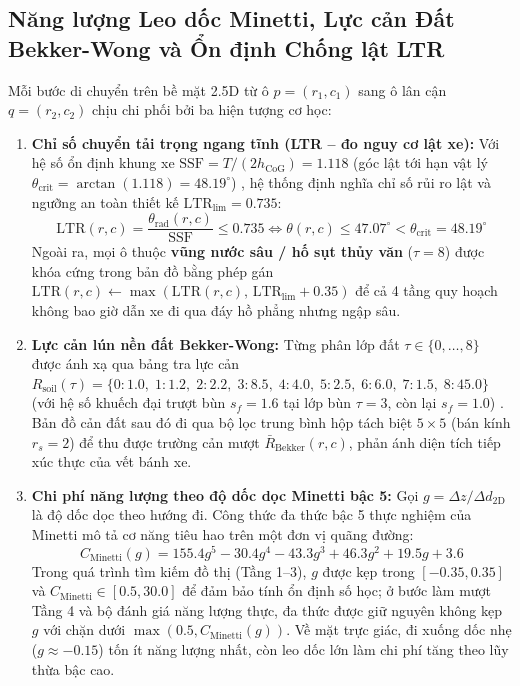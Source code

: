 \documentclass[12pt, a4paper]{article}
\begin{document}
\subsection{Năng lượng Leo dốc Minetti, Lực cản Đất Bekker-Wong và Ổn định Chống lật LTR}
Mỗi bước di chuyển trên bề mặt 2.5D từ ô $p=(r_1,c_1)$ sang ô lân cận $q=(r_2,c_2)$ chịu chi phối bởi ba hiện tượng cơ học:
\begin{enumerate}
    \item \textbf{Chỉ số chuyển tải trọng ngang tĩnh (LTR -- đo nguy cơ lật xe):} Với hệ số ổn định khung xe $\text{SSF} = T/(2h_{\text{CoG}}) = 1.118$ (góc lật tới hạn vật lý $\theta_{\text{crit}} = \arctan(1.118) = 48.19^\circ$) \cite{chen2012ltr, larish2013ltr}, hệ thống định nghĩa chỉ số rủi ro lật và ngưỡng an toàn thiết kế $\text{LTR}_{\text{lim}} = 0.735$:
    \begin{equation}
        \text{LTR}(r,c) = \frac{\theta_{\text{rad}}(r,c)}{\text{SSF}} \le 0.735 \iff \theta(r,c) \le 47.07^\circ < \theta_{\text{crit}} = 48.19^\circ
        \label{eq:ltr_safe}
    \end{equation}
    Ngoài ra, mọi ô thuộc \textbf{vũng nước sâu / hố sụt thủy văn} ($\tau = 8$) được khóa cứng trong bản đồ bằng phép gán $\text{LTR}(r,c) \leftarrow \max(\text{LTR}(r,c),\, \text{LTR}_{\text{lim}} + 0.35)$ để cả 4 tầng quy hoạch không bao giờ dẫn xe đi qua đáy hồ phẳng nhưng ngập sâu.
    \item \textbf{Lực cản lún nền đất Bekker-Wong:} Từng phân lớp đất $\tau \in \{0,\dots,8\}$ được ánh xạ qua bảng tra lực cản $R_{\text{soil}}(\tau) = \{0{:}1.0,\; 1{:}1.2,\; 2{:}2.2,\; 3{:}8.5,\; 4{:}4.0,\; 5{:}2.5,\; 6{:}6.0,\; 7{:}1.5,\; 8{:}45.0\}$ (với hệ số khuếch đại trượt bùn $s_f = 1.6$ tại lớp bùn $\tau=3$, còn lại $s_f = 1.0$) \cite{bekker1956, wong2008, higa2019}. Bản đồ cản đất sau đó đi qua bộ lọc trung bình hộp tách biệt $5\times 5$ (bán kính $r_s = 2$) để thu được trường cản mượt $\bar{R}_{\text{Bekker}}(r,c)$, phản ánh diện tích tiếp xúc thực của vết bánh xe.
    \item \textbf{Chi phí năng lượng theo độ dốc dọc Minetti bậc 5:} Gọi $g = \Delta z / \Delta d_{\text{2D}}$ là độ dốc dọc theo hướng đi. Công thức đa thức bậc 5 thực nghiệm của Minetti \cite{minetti1993, minetti2002} mô tả cơ năng tiêu hao trên một đơn vị quãng đường:
    \begin{equation}
        C_{\text{Minetti}}(g) = 155.4 g^5 - 30.4 g^4 - 43.3 g^3 + 46.3 g^2 + 19.5 g + 3.6
        \label{eq:minetti_poly}
    \end{equation}
    Trong quá trình tìm kiếm đồ thị (Tầng 1--3), $g$ được kẹp trong $[-0.35, 0.35]$ và $C_{\text{Minetti}} \in [0.5, 30.0]$ để đảm bảo tính ổn định số học; ở bước làm mượt Tầng 4 và bộ đánh giá năng lượng thực, đa thức được giữ nguyên không kẹp $g$ với chặn dưới $\max(0.5, C_{\text{Minetti}}(g))$. Về mặt trực giác, đi xuống dốc nhẹ ($g \approx -0.15$) tốn ít năng lượng nhất, còn leo dốc lớn làm chi phí tăng theo lũy thừa bậc cao.
\end{enumerate}
\end{document}
